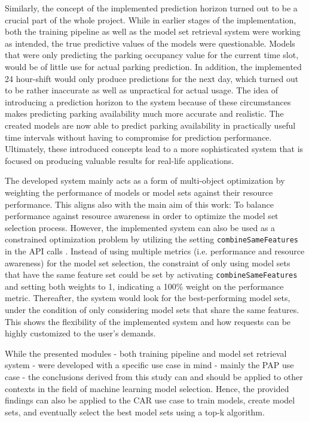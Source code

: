 Similarly, the concept of the implemented prediction horizon turned out to be a crucial part of the whole project. While in earlier stages of the implementation, both the training pipeline as well as the model set retrieval system were working as intended, the true predictive values of the models were questionable. Models that were only predicting the parking occupancy value for the current time slot, would be of little use for actual parking prediction. In addition, the implemented 24 hour-shift would only produce predictions for the next day, which turned out to be rather inaccurate as well as unpractical for actual usage. The idea of introducing a prediction horizon to the system because of these circumstances makes predicting parking availability much more accurate and realistic. The created models are now able to predict parking availability in practically useful time intervals without having to compromise for prediction performance. Ultimately, these introduced concepts lead to a more sophisticated system that is focused on producing valuable results for real-life applications.

The developed system mainly acts as a form of multi-object optimization by weighting the performance of models or model sets against their resource performance. This aligns also with the main aim of this work: To balance performance against resource awareness in order to optimize the model set selection process. However, the implemented system can also be used as a constrained optimization problem by utilizing the setting \texttt{combineSameFeatures} in the API calls \cite{feurer2019}. Instead of using multiple metrics (i.e. performance and resource awareness) for the model set selection, the constraint of only using model sets that have the same feature set could be set by activating \texttt{combineSameFeatures} and setting both weights to 1, indicating a 100\% weight on the performance metric. Thereafter, the system would look for the best-performing model sets, under the condition of only considering model sets that share the same features. This shows the flexibility of the implemented system and how requests can be highly customized to the user's demands.

While the presented modules - both training pipeline and model set retrieval system - were developed with a specific use case in mind - mainly the PAP use case - the conclusions derived from this study can and should be applied to other contexts in the field of machine learning model selection. Hence, the provided findings can also be applied to the CAR use case to train models, create model sets, and eventually select the best model sets using a top-k algorithm.\\